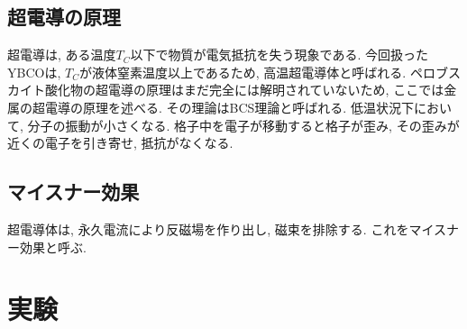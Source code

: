 \documentclass[11pt]{ltjsarticle}
\begin{document}
    \subsection*{超電導の原理}
      超電導は, ある温度$T_C$以下で物質が電気抵抗を失う現象である. 
      今回扱ったYBCOは, $T_C$が液体窒素温度以上であるため, 高温超電導体と呼ばれる. ペロブスカイト酸化物の超電導の原理はまだ完全には解明されていないため, 
      ここでは金属の超電導の原理を述べる. その理論はBCS理論と呼ばれる. 低温状況下において, 分子の振動が小さくなる.
      格子中を電子が移動すると格子が歪み, その歪みが近くの電子を引き寄せ, 抵抗がなくなる.  
    \subsection*{マイスナー効果}
      超電導体は, 永久電流により反磁場を作り出し, 磁束を排除する. これをマイスナー効果と呼ぶ. 
  \section*{実験}
\end{document}
